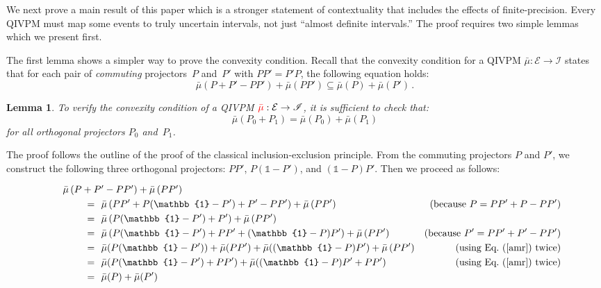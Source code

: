 \documentclass[english,reprint, aps, prl,superscriptaddress, showpacs,
showkeys, longbibliography, amsmath, amssymb, floatfix]{revtex4-1}
\theoremstyle{plain}
\newtheorem{lemma}{Lemma}
\theoremstyle{definition}
\newcommand{\events}{\ensuremath{\mathcal{E}}}
\begin{document}
We next prove a main result of this paper which is a stronger
statement of contextuality that includes the effects of
finite-precision.  Every QIVPM must map some events to truly uncertain
intervals, not just ``almost definite intervals.'' The proof requires
two simple lemmas which we present first. 

The first lemma shows a simpler way to prove the convexity
condition. Recall that the convexity condition for a QIVPM
$\bar{\mu} : \events \rightarrow \mathscr{I}$ states that for each pair of
\emph{commuting} projectors~$P$ and~$P'$ with $PP'=P'P$, the following
equation holds:
\begin{equation}
\bar{\mu}\left(P+P'-PP'\right)+\bar{\mu}\left(PP'\right)\subseteq\bar{\mu}\left(P\right)+\bar{\mu}\left(P'\right)\,.
\end{equation}

\begin{lemma}\label{lemma:verify-convexity}
  To verify the convexity condition of a QIVPM
  ${\color{red}\bar{\mu}} : \events \rightarrow \mathscr{I}$, it is sufficient to check
  that:
\begin{equation}
\bar{\mu}\left(P_{0}+P_{1}\right)=\bar{\mu}\left(P_{0}\right)+\bar{\mu}\left(P_{1}\right)\label{amr}
\end{equation}
 for all orthogonal projectors $P_{0}$ and~$P_{1}$.
\end{lemma}
\noindent The proof follows the outline of the proof of the classical
inclusion-exclusion principle. From the commuting projectors $P$ and
$P'$, we construct the following three orthogonal projectors: $PP'$,
$P(\mathbb{1}-P')$, and $(\mathbb{1}-P)P'$. Then we proceed as
follows:
\begin{widetext}
\begin{equation*}
\begin{aligned}
\noalign{$\bar{\mu}\left(P+P'-PP'\right)+\bar{\mu}\left(PP'\right)$}
\qquad\qquad=~~&\bar{\mu}\left(PP'+P(\mathbb{1}-P')+P'-PP'\right)+\bar{\mu}\left(PP'\right) 
  & (\mbox{because } P = PP' + P - PP') \\
=~~& \bar{\mu}\left(P(\mathbb{1}-P')+P'\right)+\bar{\mu}\left(PP'\right) \\
=~~& \bar{\mu}\left(P(\mathbb{1}-P')+PP'+(\mathbb{1}-P)P'\right)+\bar{\mu}\left(PP'\right) 
      & (\mbox{because } P' = PP' + P' - PP') \\
=~~& \bar{\mu}(P(\mathbb{1}-P'))+\bar{\mu}(PP')+\bar{\mu}((\mathbb{1}-P)P')+
    \bar{\mu}\left(PP'\right) & (\mbox{using Eq.~(\ref{amr}) twice}) \\
=~~& \bar{\mu}(P(\mathbb{1}-P')+PP')+\bar{\mu}((\mathbb{1}-P)P'+PP') & (\mbox{using Eq.~(\ref{amr}) twice}) \\
=~~& \bar{\mu}(P) + \bar{\mu}(P')
\end{aligned}
\end{equation*}
\end{widetext}
\end{document}
